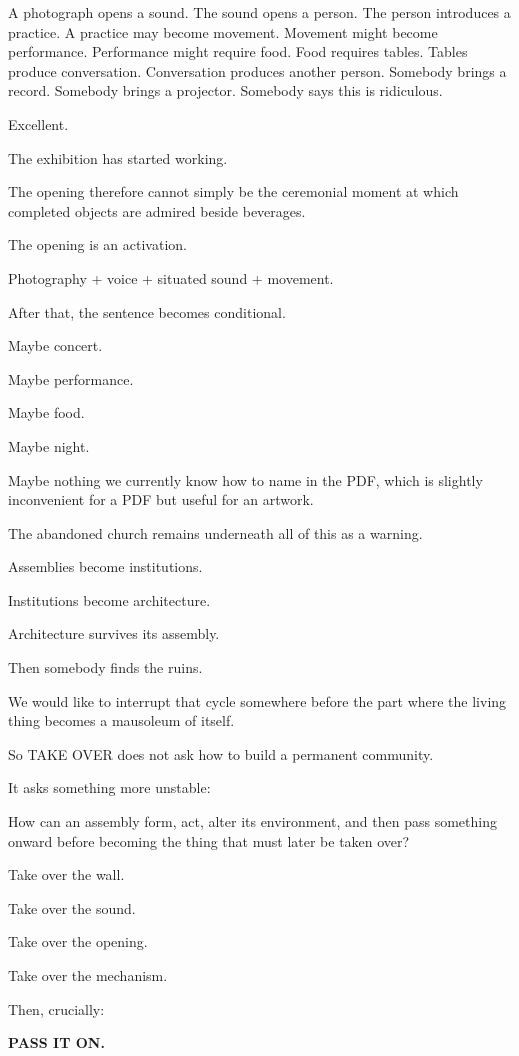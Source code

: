 A photograph opens a sound. The sound opens a person. The person
introduces a practice. A practice may become movement. Movement might
become performance. Performance might require food. Food requires
tables. Tables produce conversation. Conversation produces another
person. Somebody brings a record. Somebody brings a projector. Somebody
says this is ridiculous.

Excellent.

The exhibition has started working.

The opening therefore cannot simply be the ceremonial moment at which
completed objects are admired beside beverages.

The opening is an activation.

Photography + voice + situated sound + movement.

After that, the sentence becomes conditional.

Maybe concert.

Maybe performance.

Maybe food.

Maybe night.

Maybe nothing we currently know how to name in the PDF, which is
slightly inconvenient for a PDF but useful for an artwork.

The abandoned church remains underneath all of this as a warning.

Assemblies become institutions.

Institutions become architecture.

Architecture survives its assembly.

Then somebody finds the ruins.

We would like to interrupt that cycle somewhere before the part where
the living thing becomes a mausoleum of itself.

So TAKE OVER does not ask how to build a permanent community.

It asks something more unstable:

How can an assembly form, act, alter its environment, and then pass
something onward before becoming the thing that must later be taken
over?

Take over the wall.

Take over the sound.

Take over the opening.

Take over the mechanism.

Then, crucially:

\textbf{PASS IT ON.}

